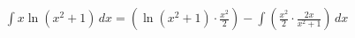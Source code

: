 \documentclass[preview]{standalone}
\begin{document}
\begin{align*}
\int x \ln(x^2 + 1) \, dx = \left( \ln(x^2 + 1) \cdot \frac{x^2}{2} \right) - \int \left( \frac{x^2}{2} \cdot \frac{2x}{x^2 + 1} \right) \, dx
\end{align*}
\end{document}
